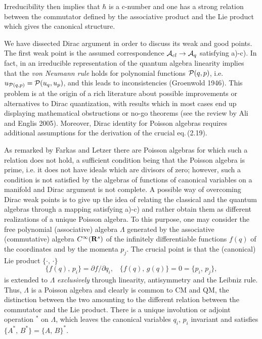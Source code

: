 \documentclass[12pt]{article}
\def \be {\begin{equation}}
\def \ee {\end{equation}}
\def \ra {\rightarrow}
\def \A {{\cal A}}
\def \P {{\cal P}}
\def \Rbf {{\bf R}}
\begin{document}
Irreducibility then implies that $\hbar$ is a c-number and one has a strong relation between the commutator defined by the associative product and the Lie product which gives the canonical structure. 

We have dissected Dirac argument in order to discuss its weak and good points. The first weak point  is the assumed correspondence $\A_{cl} 
\ra \A_q$ satisfying a)-c). 
In fact, in an irreducible representation of the quantum algebra linearity implies that the {\em von Neumann rule}  holds for polynomial functions $\P(q, p)$, i.e. $u_{\P(q,p)} = \P(u_q, u_p)$, and this leads to inconsistencies (Groenwold 1946). 
This problem is at the origin of a rich  literature about possible improvements or alternatives to Dirac quantization, with results which in most cases end up displaying  mathematical obstructions or no-go theorems (see the review by Ali and Englis 2005).
Moreover, Dirac identity for Poisson algebras requires  additional assumptions  for the derivation of  the  crucial eq.\,(2.19). 

As remarked by Farkas and Letzer there are Poisson algebras for which such a relation does not hold,  a sufficient condition being that the Poisson algebra is prime, i.e. it does not have ideals which are divisors of zero; however, such a condition is not satisfied by the algebras of functions of canonical variables on a manifold and Dirac argument is not complete.
A possible way of overcoming Dirac weak points is to give up the idea of relating  the classical and the quantum algebras through a mapping satisfying  a)-c) and rather obtain them as different realizations of a unique  Poisson algebra. 
To this purpose,  one may consider the free polynomial (associative) algebra $\Lambda$ generated by the associative (commutative) algebra $C^\infty(\Rbf^s)$ of the  
infinitely differentiable functions $f(q)$ of the coordinates  and by the  momenta $p_j$. 
 The crucial point is that the (canonical)  Lie product $\{ \cdot, \,\cdot \}$  \be{ \{ f(q),\, p_i \} = \partial f /\partial q_i, \,\,\,\,\,\{ f(q),\, g(q) \} = 0 = \{ p_i, \,p_j \}, }\ee is extended to  $\Lambda$  {\em exclusively} through linearity, antisymmetry and the Leibniz rule.  
Thus, $\Lambda$ is  a Poisson algebra and clearly is common to CM and QM, the distinction between the two amounting to the different relation between the commutator and the Lie product. 
There is a unique involution or adjoint operation $^*$ on $\Lambda$, which leaves the canonical variables $q_i$, $p_i$ invariant and satisfies $\{ A^*, \,B^* \} = \{ A, \, B \}^*$. 
\end{document}
